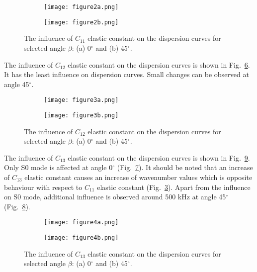{ \begin{figure} [h!]
 	\centering
 	\begin{subfigure}[b]{0.47\textwidth}
 		\texttt{[image: figure2a.png]}
 		\caption{}
 		\label{fig:C11_0}
 	\end{subfigure}
 	\hfill
 	\begin{subfigure}[b]{0.47\textwidth}
 		\texttt{[image: figure2b.png]}
 		\caption{}
 		\label{fig:C11_45}
 	\end{subfigure}
 	\caption{The influence of \(C_{11}\) elastic constant on the dispersion curves for selected angle \(\beta\): (a) 0\(^{\circ}\) and (b) 45\(^{\circ}\).} 
 	\label{fig:C11}
 \end{figure}
 
 The influence of \(C_{12}\) elastic constant on the dispersion curves is shown in Fig.~\ref{fig:C12}.
 It has the least influence on dispersion curves.
 Small changes can be observed at angle 45\(^{\circ}\).
 
 \begin{figure} [h!]
 	\centering
 	\begin{subfigure}[b]{0.47\textwidth}
 		\centering
 		\texttt{[image: figure3a.png]}
 		\caption{}
 		\label{fig:C12_0}
 	\end{subfigure}
 	\hfill
 	\begin{subfigure}[b]{0.47\textwidth}
 		\centering
 		\texttt{[image: figure3b.png]}
 		\caption{}
 		\label{fig:C12_45}
 	\end{subfigure}
 	\caption{The influence of \(C_{12}\) elastic constant on the dispersion curves for selected angle \(\beta\): (a) 0\(^{\circ}\) and (b) 45\(^{\circ}\).} 
 	\label{fig:C12}
 \end{figure}
 
 The influence of \(C_{13}\) elastic constant on the dispersion curves is shown in Fig.~\ref{fig:C13}.
 Only S0 mode is affected at angle 0\(^{\circ}\) (Fig.~\ref{fig:C13_0}).
 It should be noted that an increase of  \(C_{13}\) elastic constant causes an increase of wavenumber values which is opposite behaviour with respect to \(C_{11}\) elastic constant (Fig.~\ref{fig:C11}).
 Apart from the influence on S0 mode, additional influence is observed around 500 kHz at angle 45\(^{\circ}\) (Fig.~\ref{fig:C13_45}).
 
 \begin{figure} [h!]
 	\centering
 	\begin{subfigure}[b]{0.47\textwidth}
 		\centering
 		\texttt{[image: figure4a.png]}
 		\caption{}
 		\label{fig:C13_0}
 	\end{subfigure}
 	\hfill
 	\begin{subfigure}[b]{0.47\textwidth}
 		\centering
 		\texttt{[image: figure4b.png]}
 		\caption{}
 		\label{fig:C13_45}
 	\end{subfigure}
 	\caption{The influence of \(C_{13}\) elastic constant on the dispersion curves for selected angle \(\beta\): (a) 0\(^{\circ}\) and (b) 45\(^{\circ}\).} 
 	\label{fig:C13}
 \end{figure}
 
}
